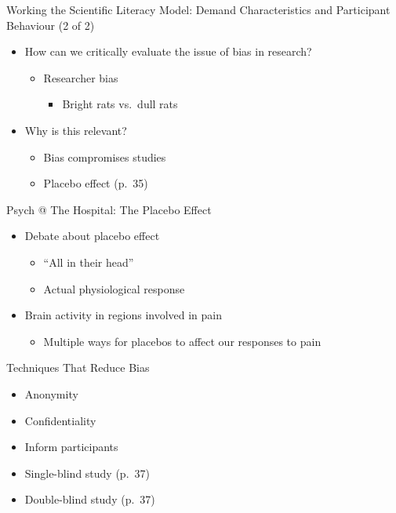 \documentclass[
]{book}
\providecommand{\tightlist}{%
  \setlength{\itemsep}{0pt}\setlength{\parskip}{0pt}}
\begin{document}
Working the Scientific Literacy Model: Demand Characteristics and Participant Behaviour (2 of 2)

\begin{itemize}
\tightlist
\item
  How can we critically evaluate the issue of bias in research?

  \begin{itemize}
  \tightlist
  \item
    Researcher bias

    \begin{itemize}
    \tightlist
    \item
      Bright rats vs.~dull rats\\
    \end{itemize}
  \end{itemize}
\item
  Why is this relevant?

  \begin{itemize}
  \tightlist
  \item
    Bias compromises studies\\
  \item
    Placebo effect (p.~35)
  \end{itemize}
\end{itemize}

Psych @ The Hospital: The Placebo Effect

\begin{itemize}
\tightlist
\item
  Debate about placebo effect

  \begin{itemize}
  \tightlist
  \item
    ``All in their head''\\
  \item
    Actual physiological response\\
  \end{itemize}
\item
  Brain activity in regions involved in pain

  \begin{itemize}
  \tightlist
  \item
    Multiple ways for placebos to affect our responses to pain
  \end{itemize}
\end{itemize}

Techniques That Reduce Bias

\begin{itemize}
\tightlist
\item
  Anonymity\\
\item
  Confidentiality\\
\item
  Inform participants\\
\item
  Single-blind study (p.~37)\\
\item
  Double-blind study (p.~37)
\end{itemize}
\end{document}
